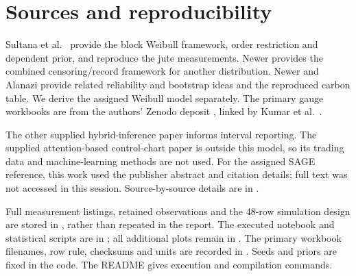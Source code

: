 \appendix
\section{Sources and reproducibility}\label{sec:appendix-sources}
Sultana et al.\ \cite{Sultana2026} provide the block Weibull framework, order restriction and dependent prior, and reproduce the jute measurements. Newer \cite{Newer2025} provides the combined censoring/record framework for another distribution. Newer and Alanazi \cite{NewerAlanazi2026} provide related reliability and bootstrap ideas and the reproduced carbon table. We derive the assigned Weibull model separately. The primary gauge workbooks are from the authors' Zenodo deposit \cite{KumarData2020}, linked by Kumar et al.\ \cite{Kumar2024}.

The other supplied hybrid-inference paper informs interval reporting. The supplied attention-based control-chart paper is outside this model, so its trading data and machine-learning methods are not used. For the assigned SAGE reference, this work used the publisher abstract and citation details; full text was not accessed in this session. Source-by-source details are in .

Full measurement listings, retained observations and the 48-row simulation design are stored in , rather than repeated in the report. The executed notebook and statistical scripts are in ; all additional plots remain in . The primary workbook filenames, row rule, checksums and units are recorded in . Seeds and priors are fixed in the code. The README gives execution and compilation commands.
